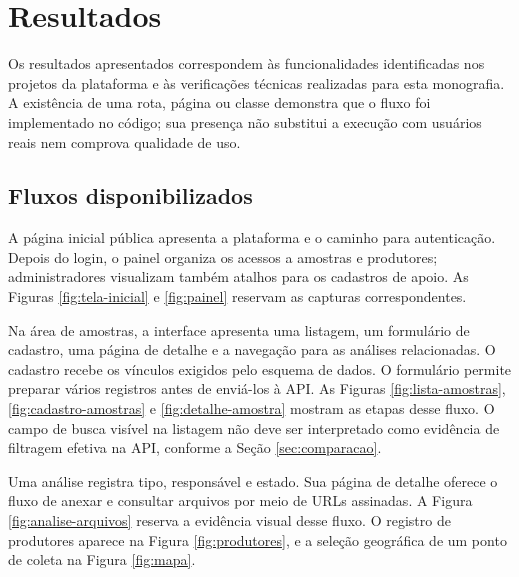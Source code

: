\chapter{Resultados}
\label{chap:resultados}

Os resultados apresentados correspondem às funcionalidades identificadas nos projetos da plataforma e às verificações técnicas realizadas para esta monografia. A existência de uma rota, página ou classe demonstra que o fluxo foi implementado no código; sua presença não substitui a execução com usuários reais nem comprova qualidade de uso.

\section{Fluxos disponibilizados}
\label{sec:fluxos}

A página inicial pública apresenta a plataforma e o caminho para autenticação. Depois do login, o painel organiza os acessos a amostras e produtores; administradores visualizam também atalhos para os cadastros de apoio. As Figuras \ref{fig:tela-inicial} e \ref{fig:painel} reservam as capturas correspondentes.


Na área de amostras, a interface apresenta uma listagem, um formulário de cadastro, uma página de detalhe e a navegação para as análises relacionadas. O cadastro recebe os vínculos exigidos pelo esquema de dados. O formulário permite preparar vários registros antes de enviá-los à API. As Figuras \ref{fig:lista-amostras}, \ref{fig:cadastro-amostras} e \ref{fig:detalhe-amostra} mostram as etapas desse fluxo. O campo de busca visível na listagem não deve ser interpretado como evidência de filtragem efetiva na API, conforme a Seção \ref{sec:comparacao}.


Uma análise registra tipo, responsável e estado. Sua página de detalhe oferece o fluxo de anexar e consultar arquivos por meio de URLs assinadas. A Figura \ref{fig:analise-arquivos} reserva a evidência visual desse fluxo. O registro de produtores aparece na Figura \ref{fig:produtores}, e a seleção geográfica de um ponto de coleta na Figura \ref{fig:mapa}.

